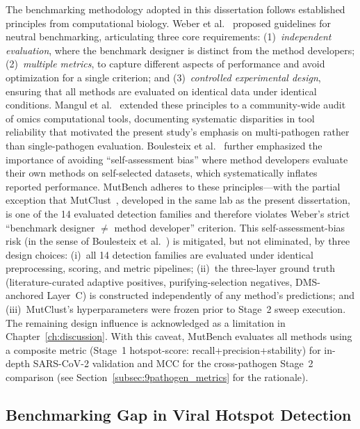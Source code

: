 The benchmarking methodology adopted in this dissertation follows established principles from computational biology.
Weber et al.~\cite{weber2019benchmarking} proposed guidelines for neutral benchmarking, articulating three core requirements: (1)~\textit{independent evaluation}, where the benchmark designer is distinct from the method developers; (2)~\textit{multiple metrics}, to capture different aspects of performance and avoid optimization for a single criterion; and (3)~\textit{controlled experimental design}, ensuring that all methods are evaluated on identical data under identical conditions. Mangul et al.~\cite{mangul2019systematic} extended these principles to a community-wide audit of omics computational tools, documenting systematic disparities in tool reliability that motivated the present study's emphasis on multi-pathogen rather than single-pathogen evaluation.
Boulesteix et al.~\cite{boulesteix2017towards} further emphasized the importance of avoiding ``self-assessment bias'' where method developers evaluate their own methods on self-selected datasets, which systematically inflates reported performance.
MutBench adheres to these principles---with the partial exception that MutClust~\cite{youn2025mutclust}, developed in the same lab as the present dissertation, is one of the 14 evaluated detection families and therefore violates Weber's strict ``benchmark designer $\neq$ method developer'' criterion. This self-assessment-bias risk (in the sense of Boulesteix et al.~\cite{boulesteix2017towards}) is mitigated, but not eliminated, by three design choices: (i)~all 14 detection families are evaluated under identical preprocessing, scoring, and metric pipelines; (ii)~the three-layer ground truth (literature-curated adaptive positives, purifying-selection negatives, DMS-anchored Layer~C) is constructed independently of any method's predictions; and (iii)~MutClust's hyperparameters were frozen prior to Stage~2 sweep execution. The remaining design influence is acknowledged as a limitation in Chapter~\ref{ch:discussion}. With this caveat, MutBench evaluates all methods using a composite metric (Stage~1 hotspot-score: recall+precision+stability) for in-depth SARS-CoV-2 validation and MCC for the cross-pathogen Stage~2 comparison (see Section~\ref{subsec:9pathogen_metrics} for the rationale).

\subsection{Benchmarking Gap in Viral Hotspot Detection}
\label{subsec:bg_benchmarking_gap}


